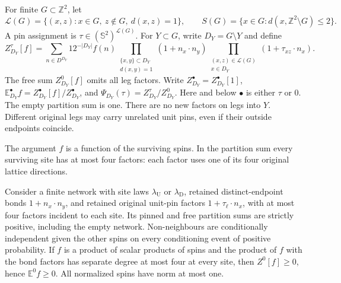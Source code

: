 \begin{definition}\label{d:pinmodel}
For finite \(G\subset\mathbb Z^2\), let
\[
 \mathcal L(G)=\{(x,z):x\in G,\ z\notin G,\ d(x,z)=1\},\qquad
 S(G)=\{x\in G:d(x,\mathbb Z^2\setminus G)\le2\}.
\]
A pin assignment is \(\tau\in(\mathbb S^2)^{\mathcal L(G)}\).
For \(Y\subset G\), write \(D_Y=G\setminus Y\) and define
\[
 Z^\tau_{D_Y}[f]=
 \sum_{n\in D^{D_Y}}12^{-|D_Y|}f(n)
 \prod_{\substack{\{x,y\}\subset D_Y\\d(x,y)=1}}(1+n_x\cdot n_y)
 \prod_{\substack{(x,z)\in\mathcal L(G)\\x\in D_Y}}
       (1+\tau_{xz}\cdot n_x).
\]
The free sum \(Z^0_{D_Y}[f]\) omits all leg factors.
Write \(Z^\bullet_{D_Y}=Z^\bullet_{D_Y}[1]\),
\(\mathbb E^\bullet_{D_Y}f=Z^\bullet_{D_Y}[f]/Z^\bullet_{D_Y}\),
and \(\Psi_{D_Y}(\tau)=Z^\tau_{D_Y}/Z^0_{D_Y}\).
Here and below \(\bullet\) is either \(\tau\) or \(0\).
The empty partition sum is one. There are no new factors on legs into \(Y\).
Different original legs may carry unrelated unit pins, even if their
outside endpoints coincide.
\end{definition}

The argument \(f\) is a function of the surviving spins. In the
partition sum every surviving site has at most four factors: each
factor uses one of its four original lattice directions.

\begin{lemma}\label{l:finitefacts}
Consider a finite network with site laws \(\lambda_{\mathrm U}\) or
\(\lambda_{\mathrm D}\), retained distinct-endpoint bonds
\(1+n_x\cdot n_y\), and retained original unit-pin factors
\(1+\tau_\ell\cdot n_x\), with at most four factors incident to each site.
Its pinned and free partition sums are strictly positive, including
the empty network. Non-neighbours are conditionally independent given
the other spins on every conditioning event of positive probability.
If \(f\) is a product of scalar products of spins and the product of
\(f\) with the bond factors has separate degree at most four at every
site, then \(Z^0[f]\ge0\), hence \(\mathbb E^0 f\ge0\).
All normalized spins have norm at most one.
\end{lemma}

